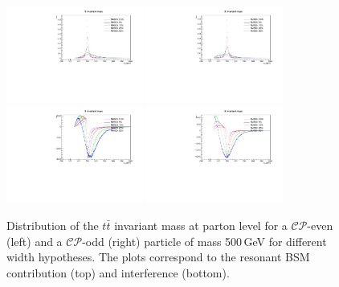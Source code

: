 \begin{figure} \centering
  \includegraphics[width=0.4\textwidth]{fig/chapt4/gen_plots/H_res_ljets_M500.pdf}
  \includegraphics[width=0.4\textwidth]{fig/chapt4/gen_plots/A_res_ljets_M500.pdf}\\
  \includegraphics[width=0.4\textwidth]{fig/chapt4/gen_plots/H_int_ljets_M500.pdf}
  \includegraphics[width=0.4\textwidth]{fig/chapt4/gen_plots/A_int_ljets_M500.pdf}\\
  \caption{Distribution of the $t\bar t$ invariant mass at parton level for a $\mathcal{CP}$-even (left) and a $\mathcal{CP}$-odd (right) particle of mass 500\,GeV for different width hypotheses. The plots correspond to the resonant BSM contribution (top) and interference (bottom).}
  \label{fig:mtt_gen_500}
\end{figure}

